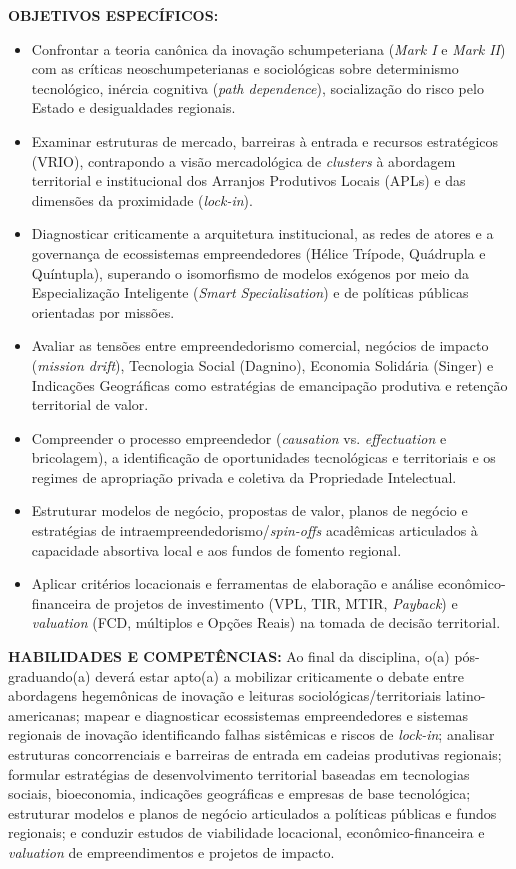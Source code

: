 \documentclass[11pt,a4paper]{article}
\begin{document}
\vspace{8pt}
\noindent\textbf{OBJETIVOS ESPECÍFICOS:}
\begin{itemize}
  \item Confrontar a teoria canônica da inovação schumpeteriana (\textit{Mark I} e \textit{Mark II}) com as críticas neoschumpeterianas e sociológicas sobre determinismo tecnológico, inércia cognitiva (\textit{path dependence}), socialização do risco pelo Estado e desigualdades regionais.
  \item Examinar estruturas de mercado, barreiras à entrada e recursos estratégicos (VRIO), contrapondo a visão mercadológica de \textit{clusters} à abordagem territorial e institucional dos Arranjos Produtivos Locais (APLs) e das dimensões da proximidade (\textit{lock-in}).
  \item Diagnosticar criticamente a arquitetura institucional, as redes de atores e a governança de ecossistemas empreendedores (Hélice Trípode, Quádrupla e Quíntupla), superando o isomorfismo de modelos exógenos por meio da Especialização Inteligente (\textit{Smart Specialisation}) e de políticas públicas orientadas por missões.
  \item Avaliar as tensões entre empreendedorismo comercial, negócios de impacto (\textit{mission drift}), Tecnologia Social (Dagnino), Economia Solidária (Singer) e Indicações Geográficas como estratégias de emancipação produtiva e retenção territorial de valor.
  \item Compreender o processo empreendedor (\textit{causation} vs. \textit{effectuation} e bricolagem), a identificação de oportunidades tecnológicas e territoriais e os regimes de apropriação privada e coletiva da Propriedade Intelectual.
  \item Estruturar modelos de negócio, propostas de valor, planos de negócio e estratégias de intraempreendedorismo/\textit{spin-offs} acadêmicas articulados à capacidade absortiva local e aos fundos de fomento regional.
  \item Aplicar critérios locacionais e ferramentas de elaboração e análise econômico-financeira de projetos de investimento (VPL, TIR, MTIR, \textit{Payback}) e \textit{valuation} (FCD, múltiplos e Opções Reais) na tomada de decisão territorial.
\end{itemize}

\vspace{8pt}
\noindent\textbf{HABILIDADES E COMPETÊNCIAS:} Ao final da disciplina, o(a) pós-graduando(a) deverá estar apto(a) a mobilizar criticamente o debate entre abordagens hegemônicas de inovação e leituras sociológicas/territoriais latino-americanas; mapear e diagnosticar ecossistemas empreendedores e sistemas regionais de inovação identificando falhas sistêmicas e riscos de \textit{lock-in}; analisar estruturas concorrenciais e barreiras de entrada em cadeias produtivas regionais; formular estratégias de desenvolvimento territorial baseadas em tecnologias sociais, bioeconomia, indicações geográficas e empresas de base tecnológica; estruturar modelos e planos de negócio articulados a políticas públicas e fundos regionais; e conduzir estudos de viabilidade locacional, econômico-financeira e \textit{valuation} de empreendimentos e projetos de impacto.
\end{document}

